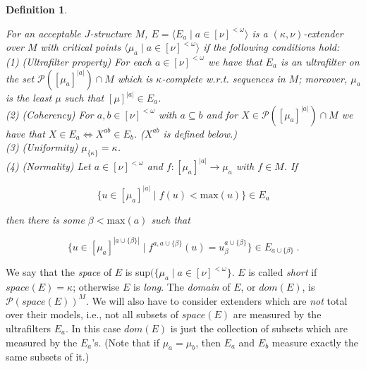 \documentclass[12pt]{article}
\newtheorem{defn}[thm]{Definition}
\begin{document}
\begin{defn} \label{extender}

For an acceptable $J$-structure $M$, $E = \langle E_a \mid a \in [ \nu ]^{< \omega} \rangle$ is a $( \kappa , \nu )$-\textit{extender over $M$ with critical points $\langle \mu_a \mid a \in [ \nu ]^{< \omega } \rangle$} if the following conditions hold:\\
 
 (1) (Ultrafilter property) For each $a \in [ \nu ]^{< \omega }$ we have that $E_a$ is an ultrafilter on the set $\mathcal{P}( [ \mu_a ]^{|a|} ) \cap M$ which is $\kappa$-complete w.r.t. sequences in $M$; moreover, $\mu_a$ is the least $\mu$ such that $[ \mu ]^{|a|} \in E_a$.\\
 
 (2) (Coherency) For $a, b \in [ \nu ]^{< \omega}$ with $a \subseteq b$ and for $X \in \mathcal{P} ( [ \mu_a ]^{|a|}) \cap M$ we have that $X \in E_a \Leftrightarrow X^{ab} \in E_b$. ($X^{ab}$ is defined below.)\\
 
 (3) (Uniformity) $\mu_{\{ \kappa \} } = \kappa$.\\
 
 (4) (Normality) Let $a \in [\nu]^{< \omega}$ and $f: [\mu_a ]^{|a|} \longrightarrow \mu_a$ with $f \in M$.  If
 
 \[
 \{ u \in [\mu_a ]^{|a|} \mid f(u) < \text{max}(u) \} \in E_a
 \]
 
 then there is some $\beta < \text{max}(a)$ such that
 
 \[
 \{ u \in [\mu_a ]^{|a \cup \{ \beta \} | } \mid f^{a , a \cup \{ \beta \} } (u) = u_\beta^{a \cup \{ \beta \} } \} \in E_{a \cup \{ \beta \} } \ .
 \]
 
 \end{defn}
 
 \bigskip
 
 We say that the \textit{space} of $E$ is sup$( \{ \mu_a  \mid a \in [ \nu ]^{< \omega } \}$.  $E$ is called \textit{short} if $space(E) = \kappa$; otherwise $E$ is \textit{long}.  The \textit{domain} of $E$, or $dom(E)$, is $\mathcal{P}( space(E))^M$.  We will also have to consider extenders which are \textit{not} total over their models, i.e., not all subsets of $space(E)$ are measured by the ultrafilters $E_a$.  In this case $dom(E)$ is just the collection of subsets which are measured by the $E_a$'s.  (Note that if $\mu_a = \mu_b$, then $E_a$ and $E_b$ measure exactly the same subsets of it.)\\
 
\end{document}

